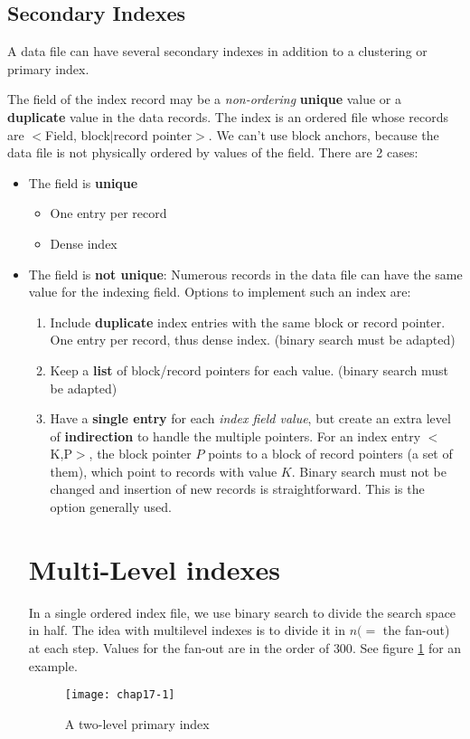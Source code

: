 \subsection{Secondary Indexes}
A data file can have several secondary indexes in addition to a clustering or primary index.

The field of the index record may be a \emph{non-ordering} \textbf{unique} value or a \textbf{duplicate} value in the data records.
The index is an ordered file whose records are $<$Field, block$|$record pointer$>$. We can't use block anchors, because the data file is not physically ordered by values of the field. 
There are 2 cases:
\begin{itemize}
    \item The field is \textbf{unique}
    \begin{itemize}
        \item One entry per record
        \item Dense index
    \end{itemize}
    \item The field is \textbf{not unique}: Numerous records in the data file can have the same value for the indexing field. Options to implement such an index are:
    \begin{enumerate}
        \item Include \textbf{duplicate} index entries with the same block or record pointer. One entry per record, thus dense index. (binary search must be adapted)
        \item Keep a \textbf{list} of block/record pointers for each value. (binary search must be adapted)
        \item Have a \textbf{single entry} for each \emph{index field value}, but create an extra level of \textbf{indirection} to handle the multiple pointers. For an index entry $<$K,P$>$, the block pointer $P$ points to a block of record pointers (a set of them), which point to records with value $K$. Binary search must not be changed and insertion of new records is straightforward. This is the option generally used.
    \end{enumerate}


\section{Multi-Level indexes}
In a single ordered index file, we use binary search to divide the search space in half. The idea with multilevel indexes is to divide it in $n (=$ the fan-out) at each step. Values for the fan-out are in the order of $300$.
See figure \ref{fig:chap17-multilevel} for an example.
\begin{figure}
    \centering
    \texttt{[image: chap17-1]}
    \caption{A two-level primary index}
    \label{fig:chap17-multilevel}
\end{figure}


\end{itemize}
